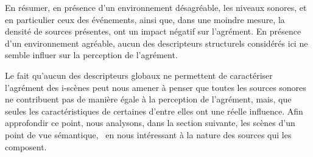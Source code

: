 En résumer, en présence d'un environnement désagréable, les niveaux sonores, et en particulier ceux des événements, ainsi que, dans une moindre mesure, la densité de sources présentes, ont un impact négatif sur l'agrément. En présence d'un environnement agréable, aucun des descripteurs structurels considérés ici ne semble influer sur la perception de l'agrément. 


Le fait qu'aucun des descripteurs globaux ne permettent de caractériser l'agrément des i-scènes peut nous amener à penser que toutes les sources sonores ne contribuent pas de manière égale à la perception de l'agrément, mais, que seules les caractéristiques de certaines d'entre elles ont une réelle influence. Afin approfondir ce point, nous analysons, dans la section suivante, les scènes d'un point de vue sémantique, \ie~en nous intéressant à la nature des sources qui les composent. \\


